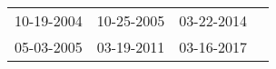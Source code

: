 \begin{supertabular}{llll}
 10-19-2004 &  10-25-2005 &  03-22-2014 \\
 05-03-2005 &  03-19-2011 &  03-16-2017 \\
\end{supertabular}
